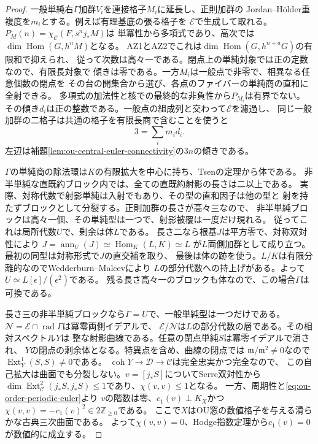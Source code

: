 \documentclass[11pt,a4paper]{ltjsarticle}
\theoremstyle{definition}
\newcommand{\coh}{\operatorname{coh}}
\begin{document}
\begin{proof}
一般単純右$\Gamma$加群$V_i$を連接格子$M_i$に延長し、正則加群の
Jordan--Hölder重複度を$m_i$とする。例えば有理基底の張る格子を
$\mathcal E$で生成して取れる。$P_M(n)=\chi_{\mathcal C}(F,s^n j_*M)$は
単冪性から多項式であり、高次では$\dim\operatorname{Hom}(G,h^n M)$となる。
AZ1とAZ2でこれは$\dim\operatorname{Hom}(G,h^{n+a}G)$の有限和で抑えられ、
従って次数は高々一である。閉点上の単純対象では正の定数なので、有限長対象で
傾きは零である。一方$M_i$は一般点で非零で、相異なる任意個数の閉点を
その台の開集合から選び、各点のファイバーの単純商の直和に全射できる。
多項式の加法性と核での最終的な非負性から$P_{M_i}$は有界でない。
その傾き$d_i$は正の整数である。一般点の組成列と交わって$\mathcal E$を濾過し、
同じ一般加群の二格子は共通の格子を有限長商で含むことを使うと
\[
                         3=\sum_i m_i d_i .
\]
左辺は補題\ref{lem:ou-central-euler-connectivity}の$3n$の傾きである。

$\Gamma$の単純商の除法環は$K$の有限拡大を中心に持ち、Tsenの定理から体である。
非半単純な直既約ブロック内では、全ての直既約射影の長さは二以上である。
実際、対称代数で射影単純は入射でもあり、その型の直和因子は他の型と
射を持たずブロックとして分裂する。正則加群の長さが高々三なので、
非半単純ブロックは高々一個、その単純型は一つで、射影被覆は一度だけ現れる。
従ってこれは局所代数$U$で、剰余は体$L$である。
長さ二なら根基$J$は平方零で、対称双対性により
$J=\operatorname{ann}_{U}(J)\simeq\operatorname{Hom}_K(L,K)\simeq L$
が$L$両側加群として成り立つ。最初の同型は対称形式で$J$の直交補を取り、
最後は体の跡を使う。$L/K$は有限分離的なのでWedderburn--Malcevにより
$L$の部分代数への持上げがある。よって$U\simeq L[\epsilon]/(\epsilon^2)$である。
残る長さ高々一のブロックも体なので、この場合$\Gamma$は可換である。

長さ三の非半単純ブロックなら$\Gamma=U$で、一般単純型は一つだけである。
$\mathcal N=\mathcal E\cap\operatorname{rad}\Gamma$は冪零両側イデアルで、
$\mathcal E/\mathcal N$は$L$の部分代数の層である。その相対スペクトル$Y$は
整な射影曲線である。任意の閉点単純$S$は冪零イデアルで消され、
$Y$の閉点の剰余体となる。特異点を含め、曲線の閉点では
$\mathfrak m/\mathfrak m^2\ne0$なので$\operatorname{Ext}^1_Y(S,S)\ne0$である。
$\coh Y\to\mathcal D\to\mathcal C$は完全忠実かつ完全なので、
この自己拡大は曲面でも分裂しない。$v=[j_*S]$についてSerre双対性から
$\dim\operatorname{Ext}^2_{\mathcal C}(j_*S,j_*S)\le1$であり、$\chi(v,v)\le1$となる。
一方、周期性と\eqref{eq:ou-order-periodic-euler}より
$v$の階数は零、$c_1(v)\perp K_X$かつ
$\chi(v,v)=-c_1(v)^2\in2\mathbb Z_{\ge0}$である。
ここで$X$はOU窓の数値格子を与える滑らかな古典三次曲面である。
よって$\chi(v,v)=0$、Hodge指数定理から$c_1(v)=0$が数値的に成立する。


\end{proof}
\end{document}
